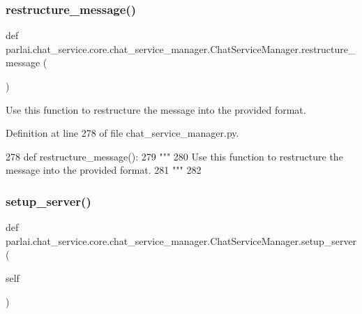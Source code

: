 \subsubsection{\texorpdfstring{restructure\+\_\+message()}{restructure\_message()}}
{\footnotesize\ttfamily def parlai.\+chat\+\_\+service.\+core.\+chat\+\_\+service\+\_\+manager.\+Chat\+Service\+Manager.\+restructure\+\_\+message (\begin{DoxyParamCaption}{ }\end{DoxyParamCaption})}

\begin{DoxyVerb}Use this function to restructure the message into the provided format.
\end{DoxyVerb}
 

Definition at line 278 of file chat\+\_\+service\+\_\+manager.\+py.


\begin{DoxyCode}
278     \textcolor{keyword}{def }restructure\_message():
279         \textcolor{stringliteral}{"""}
280 \textcolor{stringliteral}{        Use this function to restructure the message into the provided format.}
281 \textcolor{stringliteral}{        """}
282 
\end{DoxyCode}
\mbox{\label{classparlai_1_1chat__service_1_1core_1_1chat__service__manager_1_1ChatServiceManager_a147d73ca0427e9571a3c462d75412536}} 
\subsubsection{\texorpdfstring{setup\+\_\+server()}{setup\_server()}}
{\footnotesize\ttfamily def parlai.\+chat\+\_\+service.\+core.\+chat\+\_\+service\+\_\+manager.\+Chat\+Service\+Manager.\+setup\+\_\+server (\begin{DoxyParamCaption}\item[{}]{self }\end{DoxyParamCaption})}

